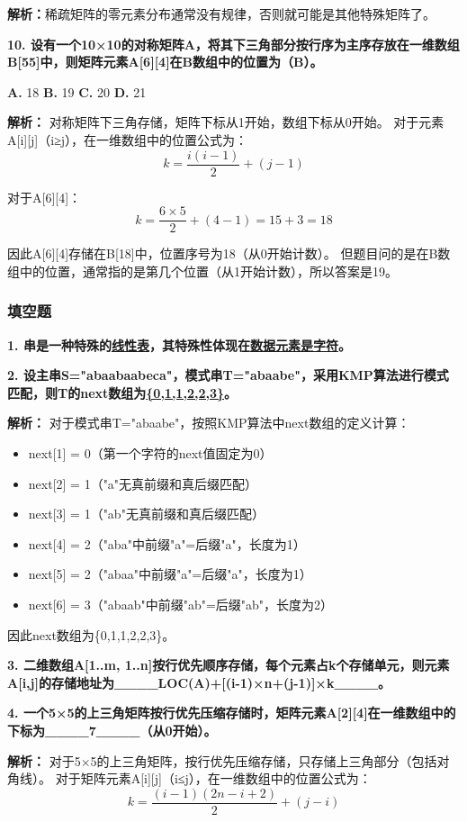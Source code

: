 \documentclass[12pt,a4paper]{amsart}
\begin{document}
\textbf{解析：}稀疏矩阵的零元素分布通常没有规律，否则就可能是其他特殊矩阵了。

\textbf{10. 设有一个10×10的对称矩阵A，将其下三角部分按行序为主序存放在一维数组B[55]中，则矩阵元素A[6][4]在B数组中的位置为（B）。}

\textbf{A.} 18
\textbf{B.} 19
\textbf{C.} 20
\textbf{D.} 21

\textbf{解析：}
对称矩阵下三角存储，矩阵下标从1开始，数组下标从0开始。
对于元素A[i][j]（i≥j），在一维数组中的位置公式为：
$$k = \frac{i(i-1)}{2} + (j-1)$$

对于A[6][4]：
$$k = \frac{6 \times 5}{2} + (4-1) = 15 + 3 = 18$$

因此A[6][4]存储在B[18]中，位置序号为18（从0开始计数）。
但题目问的是在B数组中的位置，通常指的是第几个位置（从1开始计数），所以答案是19。

\subsubsection{填空题}

\textbf{1. 串是一种特殊的\underline{线性表}，其特殊性体现在\underline{数据元素是字符}。}

\textbf{2. 设主串S="abaabaabeca"，模式串T="abaabe"，采用KMP算法进行模式匹配，则T的next数组为\underline{\{0,1,1,2,2,3\}}。}

\textbf{解析：}
对于模式串T="abaabe"，按照KMP算法中next数组的定义计算：
\begin{itemize}
\item next[1] = 0（第一个字符的next值固定为0）
\item next[2] = 1（"a"无真前缀和真后缀匹配）
\item next[3] = 1（"ab"无真前缀和真后缀匹配）
\item next[4] = 2（"aba"中前缀"a"=后缀"a"，长度为1）
\item next[5] = 2（"abaa"中前缀"a"=后缀"a"，长度为1）
\item next[6] = 3（"abaab"中前缀"ab"=后缀"ab"，长度为2）
\end{itemize}

因此next数组为\{0,1,1,2,2,3\}。

\textbf{3. 二维数组A[1..m, 1..n]按行优先顺序存储，每个元素占k个存储单元，则元素A[i,j]的存储地址为\_\_\_\_LOC(A)+[(i-1)×n+(j-1)]×k\_\_\_\_。}

\textbf{4. 一个5×5的上三角矩阵按行优先压缩存储时，矩阵元素A[2][4]在一维数组中的下标为\_\_\_\_7\_\_\_\_（从0开始）。}

\textbf{解析：}
对于5×5的上三角矩阵，按行优先压缩存储，只存储上三角部分（包括对角线）。
对于矩阵元素A[i][j]（i≤j），在一维数组中的位置公式为：
$$k = \frac{(i-1)(2n-i+2)}{2} + (j-i)$$
\end{document}
